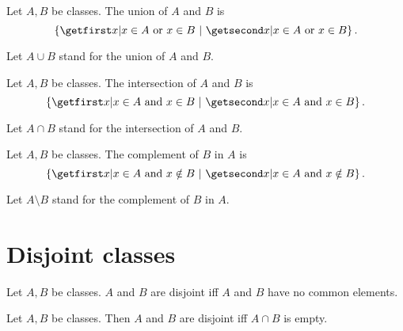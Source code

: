 \documentclass[../../set-theory/set-theory.tex]{subfiles}
\begin{document}
  \begin{forthel}
    \begin{definition}
      Let $A, B$ be classes.
      The union of $A$ and $B$ is
      \[ \class{ x | \text{$x \in A$ or $x \in B$} }. \]
    \end{definition}

    Let $A \cup B$ stand for the union of $A$ and $B$.
  \end{forthel}

  \begin{forthel}
    \begin{definition}
      Let $A, B$ be classes.
      The intersection of $A$ and $B$ is
      \[ \class{ x | \text{$x \in A$ and $x \in B$} }. \]
    \end{definition}

    Let $A \cap B$ stand for the intersection of $A$ and $B$.
  \end{forthel}

  \begin{forthel}
    \begin{definition}
      Let $A, B$ be classes.
      The complement of $B$ in $A$ is
      \[ \class{ x | \text{$x \in A$ and $x \notin B$} }. \]
    \end{definition}

    Let $A \setminus B$ stand for the complement of $B$ in $A$.
  \end{forthel}


  \section{Disjoint classes}

  \begin{forthel}
    \begin{definition}
      Let $A, B$ be classes.
      $A$ and $B$ are disjoint iff $A$ and $B$ have no common elements.
    \end{definition}
  \end{forthel}

  \begin{forthel}
    \begin{proposition}
      Let $A, B$ be classes.
      Then $A$ and $B$ are disjoint iff $A \cap B$ is empty.
    \end{proposition}
  \end{forthel}
\end{document}
